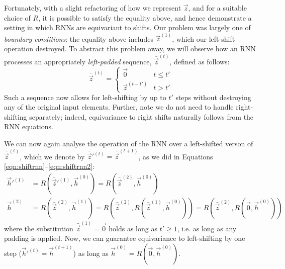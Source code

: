 Fortunately, with a slight refactoring of how we represent $\vec{z}$, and for a suitable choice of $R$, it is possible to satisfy the equality above, and hence demonstrate a setting in which RNNs are equivariant to shifts.
%
Our problem was largely one of \emph{boundary conditions}: the equality above includes $\vec{z}^{(1)}$, which our left-shift operation destroyed. To abstract this problem away, we will observe how an RNN processes an appropriately \emph{left-padded} sequence, $\bar{\vec{z}}^{(t)}$, defined as follows: 
$$
    \bar{\vec{z}}^{(t)} = \begin{cases}
        \vec{0} & t \leq t'\\
        \vec{z}^{(t - t')} & t > t' 
    \end{cases}
$$
Such a sequence now allows for left-shifting by up to $t'$ steps without destroying any of the original input elements. Further, note we do not need to handle right-shifting separately; indeed, equivariance to right shifts naturally follows from the RNN equations.

We can now again analyse the operation of the RNN over a left-shifted verson of $\bar{\vec{z}}^{(t)}$, which we denote by $\bar{\vec{z}}'^{(t)} = \bar{\vec{z}}^{(t+1)}$, as we did in Equations \ref{eqn:shiftrnn}--\ref{eqn:shiftrnn2}:
\begin{align*}
    \vec{h}'^{(1)} &= R(\bar{\vec{z}}'^{(1)}, \vec{h}^{(0)}) = R(\bar{\vec{z}}^{(2)}, \vec{h}^{(0)})\\ \vec{h}^{(2)} &= R(\bar{\vec{z}}^{(2)}, \vec{h}^{(1)}) = R(\bar{\vec{z}}^{(2)}, R(\bar{\vec{z}}^{(1)}, \vec{h}^{(0)})) = R(\bar{\vec{z}}^{(2)}, R(\vec{0}, \vec{h}^{(0)}))
\end{align*}
where the substitution $\bar{\vec{z}}^{(1)} = \vec{0}$ holds as long as $t' \geq 1$, i.e. as long as any padding is applied. Now, we can guarantee equivariance to left-shifting by one step ($\vec{h}'^{(t)} = \vec{h}^{(t+1)}$) as long as $\vec{h}^{(0)} = R(\vec{0}, \vec{h}^{(0)})$.


